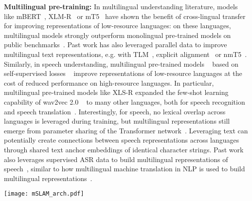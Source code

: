 \documentclass[nohyperref]{article}
\begin{document}
\textbf{Multilingual pre-training:}
In multilingual understanding literature, models like mBERT~\cite{devlin2019bert}, XLM-R~\cite{conneau2019cross} or mT5~\cite{xue-etal-2021-mt5} have shown the benefit of cross-lingual transfer for improving representations of low-resource languages: on these languages, multilingual models strongly outperform monolingual pre-trained models on public benchmarks~\cite{conneau2018xnli,conneau2019unsupervised,lewis2019mlqa,hu2020xtreme,ruder2021xtreme}. Past work has also leveraged parallel data to improve multilingual text representations, e.g. with TLM~\cite{conneau2019cross}, explicit alignment~\cite{hu-etal-2021-explicit} or nmT5~\cite{kale2021nmt5}. Similarly, in speech understanding, multilingual pre-trained models ~\cite{kawakami2020learning,conneau2020unsupervised,babu2021xls} based on self-supervised losses ~\cite{oord2018representation,baevski2020wav2vec} improve representations of low-resource languages at the cost of reduced performance on high-resource languages.  In particular, multilingual pre-trained models like XLS-R expanded the few-shot learning capability of wav2vec 2.0 ~\cite{xu2021self} to many other languages, both for speech recognition and speech translation~\cite{wang2020covost}. Interestingly, for speech, no lexical overlap across languages is leveraged during training, but multilingual representations still emerge from parameter sharing of the Transformer network~\cite{wu2019emerging}. Leveraging text can potentially create connections between speech representations across languages through shared text anchor embeddings of identical character strings. Past work also leverages supervised ASR data to build multilingual representations of speech~\cite{kannan2019large,bai2021joint}, similar to how multilingual machine translation in NLP is used to build multilingual representations~\cite{eriguchi2018zeroshot,siddhant2020evaluating}.


\begin{figure*}[t]
	\begin{center}
          \texttt{[image: mSLAM\_arch.pdf]}
        \vspace{-0.2cm}
	\end{center}
\end{figure*}
\end{document}
